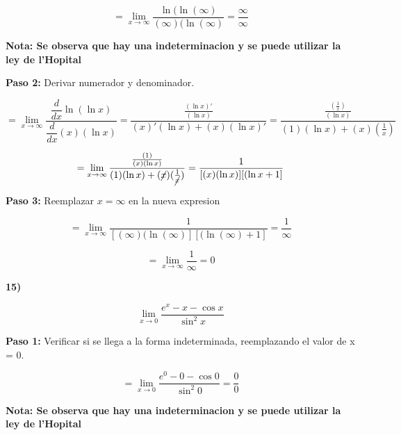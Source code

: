 \documentclass[12pt,a4paper]{article}
\begin{document}
\[
= \lim_{x \to \infty} \frac{\ln(\ln (\infty)}{(\infty)(\ln (\infty)}= \frac{\infty}{\infty}
\]


\vspace{0.2cm}

\textbf{Nota: Se observa que hay una indeterminacion y se puede utilizar la ley de l'Hopital }

\vspace{0.5cm}

\textbf{Paso 2:}
\vspace{0.2cm}
Derivar numerador y denominador.

\[
= \lim_{x \to \infty} \frac{\dfrac{d}{dx} \ln(\ln x)}{\dfrac{d}{dx} (x)(\ln x)}= \frac{\frac{(\ln x)'}{(\ln x)}}{(x)'(\ln x)+(x)(\ln x)'}= \frac{\frac{(\frac{1}{x})}{(\ln x)}}{(1)(\ln x)+(x)(\frac{1}{x})}
\]

\[
= \lim_{x \to \infty} \frac{\frac{(1)}{(x)(\ln x)}}{(1)(\ln x)+(\cancel{x})(\frac{1}{\cancel{x}})}= \frac{1}{[(x)(\ln x)][(\ln x +1]}
\]

\vspace{0.2cm}



\textbf{Paso 3:}
\vspace{0.2cm}
Reemplazar $x = \infty$ en la nueva expresion

\[
= \lim_{x \to \infty} \frac{1}{[(\infty)(\ln (\infty)][(\ln (\infty) +1]} = \frac{1}{\infty}
\]

\vspace{0.5cm}
\vspace{0.2cm}
\[
= \lim_{x \to \infty} \frac{1}{\infty} = 0
\]

\newpage

\textbf{15)}

\[
\lim_{x \to 0} \frac{e^x -x - \cos x}{\sin^{2} x} 
\]


\vspace{0.2cm}

\textbf{Paso 1:}
\vspace{0.2cm}
Verificar si se llega a la forma indeterminada, reemplazando el valor de x = 0.

\[
= \lim_{x \to 0} \frac{e^0 -0 - \cos 0}{\sin^{2} 0}= \frac{0}{0}
\]

\vspace{0.2cm}

\textbf{Nota: Se observa que hay una indeterminacion y se puede utilizar la ley de l'Hopital }

\vspace{0.5cm}
\end{document}
